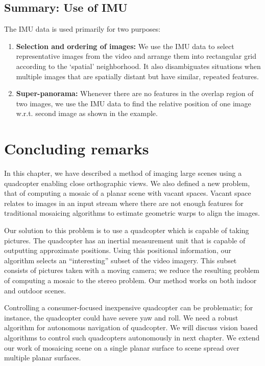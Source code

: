 \subsection{Summary: Use of IMU}
The IMU data is used primarily for two purposes:
\begin{enumerate}
\item \textbf{Selection and ordering of images:} We use the IMU data
  to select representative images from the video and arrange them into
  rectangular grid according to the `spatial' neighborhood. It also
  disambiguates situations when multiple images that are spatially
  distant but have similar, repeated features.

\item \textbf{Super-panorama:} Whenever there are no features in
  the overlap region of two images, we use the IMU data to find the
  relative position of one image w.r.t. second image as shown in the
  example. 
\end{enumerate}


\section{Concluding remarks}

In this chapter, we have described a method of imaging large scenes
using a quadcopter enabling close orthographic views. We also defined
a new problem, that of computing a mosaic of a planar scene with
vacant spaces.  Vacant space relates to images in an input stream
where there are not enough features for traditional mosaicing
algorithms to estimate geometric warps to align the images.

Our solution to this problem is to use a quadcopter which
is capable of taking pictures.  The quadcopter has an inertial
measurement unit that is capable of outputting approximate
positions. Using this positional information, our algorithm selects an
``interesting'' subset of the video imagery.  This subset consists of
pictures taken with a moving camera; we reduce the resulting
problem of computing a mosaic to the stereo problem.  Our
method works on both indoor and outdoor scenes.

Controlling a consumer-focused inexpensive quadcopter can be
problematic; for instance, the quadcopter could have severe yaw and
roll.  We need a robust algorithm for autonomous navigation of quadcopter.
We will discuss vision based algorithms to control such quadcopters autonomously
in next chapter. We extend our work of mosaicing scene on a single planar
surface to scene spread over multiple planar surfaces.
